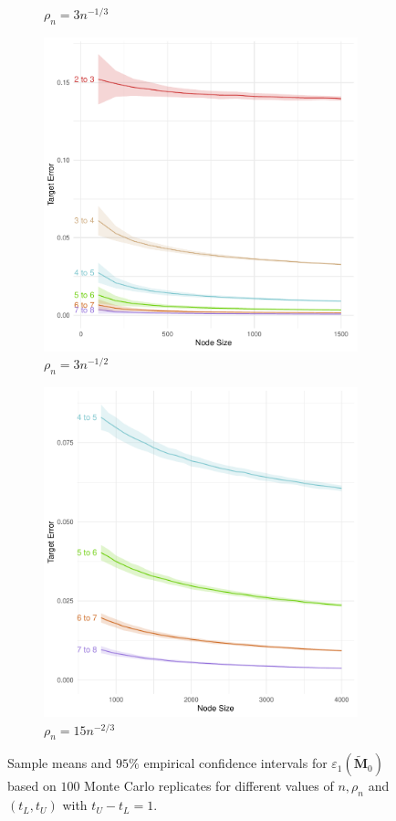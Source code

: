 \documentclass[10pt,journal,compsoc]{IEEEtran}
\numberwithin{equation}{section}
\begin{document}
\begin{figure}[htbp]
\begin{subfigure}{.49\columnwidth}
\caption{$\rho_n = 3n^{-1/3}$}
\end{subfigure}
\begin{subfigure}{.49\columnwidth}
\includegraphics[width=\columnwidth]{MM_12_1.pdf}%
\caption{$\rho_n = 3n^{-1/2}$}
\end{subfigure}
\begin{subfigure}{.49\columnwidth}
\includegraphics[width=\columnwidth]{MM_23_1.pdf}%
\caption{$\rho_n = 15n^{-2/3}$}
\end{subfigure}
\caption{Sample means and $95\%$ empirical confidence
    intervals for $\varepsilon_1(\tilde{\mathbf{M}}_0)$
    based on $100$ Monte Carlo replicates for different values of $n, \rho_n$ and 
    $(t_L, t_U)$ with $t_U - t_L = 1$.}
\label{f:rate:1}
\end{figure}
\end{document}
